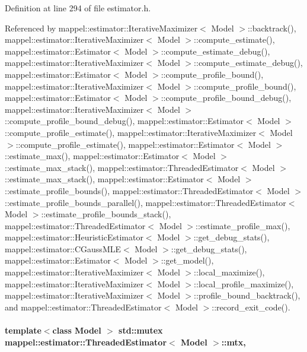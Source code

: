 Definition at line 294 of file estimator.\+h.



Referenced by mappel\+::estimator\+::\+Iterative\+Maximizer$<$ Model $>$\+::backtrack(), mappel\+::estimator\+::\+Iterative\+Maximizer$<$ Model $>$\+::compute\+\_\+estimate(), mappel\+::estimator\+::\+Estimator$<$ Model $>$\+::compute\+\_\+estimate\+\_\+debug(), mappel\+::estimator\+::\+Iterative\+Maximizer$<$ Model $>$\+::compute\+\_\+estimate\+\_\+debug(), mappel\+::estimator\+::\+Estimator$<$ Model $>$\+::compute\+\_\+profile\+\_\+bound(), mappel\+::estimator\+::\+Iterative\+Maximizer$<$ Model $>$\+::compute\+\_\+profile\+\_\+bound(), mappel\+::estimator\+::\+Estimator$<$ Model $>$\+::compute\+\_\+profile\+\_\+bound\+\_\+debug(), mappel\+::estimator\+::\+Iterative\+Maximizer$<$ Model $>$\+::compute\+\_\+profile\+\_\+bound\+\_\+debug(), mappel\+::estimator\+::\+Estimator$<$ Model $>$\+::compute\+\_\+profile\+\_\+estimate(), mappel\+::estimator\+::\+Iterative\+Maximizer$<$ Model $>$\+::compute\+\_\+profile\+\_\+estimate(), mappel\+::estimator\+::\+Estimator$<$ Model $>$\+::estimate\+\_\+max(), mappel\+::estimator\+::\+Estimator$<$ Model $>$\+::estimate\+\_\+max\+\_\+stack(), mappel\+::estimator\+::\+Threaded\+Estimator$<$ Model $>$\+::estimate\+\_\+max\+\_\+stack(), mappel\+::estimator\+::\+Estimator$<$ Model $>$\+::estimate\+\_\+profile\+\_\+bounds(), mappel\+::estimator\+::\+Threaded\+Estimator$<$ Model $>$\+::estimate\+\_\+profile\+\_\+bounds\+\_\+parallel(), mappel\+::estimator\+::\+Threaded\+Estimator$<$ Model $>$\+::estimate\+\_\+profile\+\_\+bounds\+\_\+stack(), mappel\+::estimator\+::\+Threaded\+Estimator$<$ Model $>$\+::estimate\+\_\+profile\+\_\+max(), mappel\+::estimator\+::\+Heuristic\+Estimator$<$ Model $>$\+::get\+\_\+debug\+\_\+stats(), mappel\+::estimator\+::\+C\+Gauss\+M\+L\+E$<$ Model $>$\+::get\+\_\+debug\+\_\+stats(), mappel\+::estimator\+::\+Estimator$<$ Model $>$\+::get\+\_\+model(), mappel\+::estimator\+::\+Iterative\+Maximizer$<$ Model $>$\+::local\+\_\+maximize(), mappel\+::estimator\+::\+Iterative\+Maximizer$<$ Model $>$\+::local\+\_\+profile\+\_\+maximize(), mappel\+::estimator\+::\+Iterative\+Maximizer$<$ Model $>$\+::profile\+\_\+bound\+\_\+backtrack(), and mappel\+::estimator\+::\+Threaded\+Estimator$<$ Model $>$\+::record\+\_\+exit\+\_\+code().

\paragraph[{\texorpdfstring{mtx}{mtx}}]{\setlength{\rightskip}{0pt plus 5cm}template$<$class Model $>$ std\+::mutex {\bf mappel\+::estimator\+::\+Threaded\+Estimator}$<$ Model $>$\+::mtx\hspace{0.3cm}{\ttfamily [protected]}, {\ttfamily [inherited]}}\hypertarget{classmappel_1_1estimator_1_1ThreadedEstimator_af78695378590ff8e822dffe2b1b3f242}{}\label{classmappel_1_1estimator_1_1ThreadedEstimator_af78695378590ff8e822dffe2b1b3f242}


